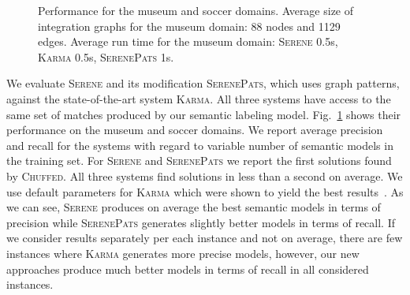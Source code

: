 \documentclass[letterpaper]{article} %
\newcommand{\chuffed}{\textsc{Chuffed}}
\newcommand{\karma}{\textsc{Karma}}
\newcommand{\serene}{\textsc{Serene}}
\newcommand{\serenepats}{\textsc{SerenePats}}
\begin{document}
\begin{figure}[!htb]
\begin{minipage}[b]{0.5\linewidth}
\label{fig:soccerrec}
\end{minipage}%
\caption{Performance for the museum and soccer domains. 
Average size of integration graphs for the museum domain: 88 nodes and 1129 
edges.
Average run time for the museum domain: \serene{} 0.5s, \karma{} 0.5s, \serenepats{} 1s. \label{fig:perf}}
\vspace{-3mm}
\end{figure}


We evaluate \serene{} and its modification \serenepats{}, which 
uses graph patterns, against the state-of-the-art system \karma{}.
All three systems have access to the same set of matches produced by our semantic labeling model.
Fig.~\ref{fig:perf} shows their performance on the museum and soccer domains.
We report average precision and recall for the systems with regard to variable 
number of semantic models in the training set.
For \serene{} and \serenepats{} we report the first solutions found by
\chuffed{}. All three systems find solutions in less than a second on average.
We use default parameters for \karma{} which were shown to yield the best 
results~\cite{taheriyan2016learning}.
As we can see, \serene{} produces on average the best semantic models in terms 
of precision while \serenepats{} generates slightly better models in terms of 
recall.
If we consider results separately per each instance and not on average, there 
are few instances where \karma{} generates more precise models, however, our 
new approaches produce much better models in terms of recall in all considered 
instances. 
\end{document}
